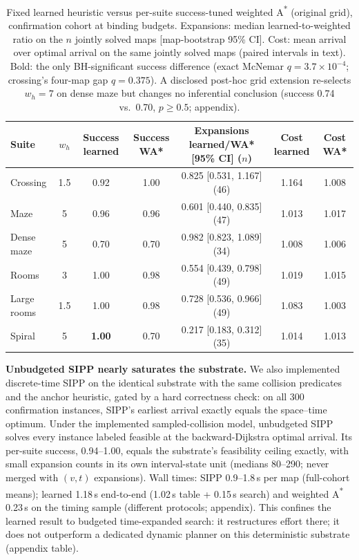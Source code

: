 \documentclass[letterpaper]{article} %
\begin{document}
\begin{table}[t]
\centering
\small
\begin{tabular}{lcccccc}
\toprule
Suite & $w_h$ & Success learned & Success WA* & Expansions learned/WA* [95\% CI] ($n$) & Cost learned & Cost WA* \\
\midrule
Crossing & 1.5 & 0.92 & 1.00 & 0.825 [0.531, 1.167] (46) & 1.164 & 1.008 \\
Maze & 5 & 0.96 & 0.96 & 0.601 [0.440, 0.835] (47) & 1.013 & 1.017 \\
Dense maze & 5 & 0.70 & 0.70 & 0.982 [0.823, 1.089] (34) & 1.008 & 1.006 \\
Rooms & 3 & 1.00 & 0.98 & 0.554 [0.439, 0.798] (49) & 1.019 & 1.015 \\
Large rooms & 1.5 & 1.00 & 0.98 & 0.728 [0.536, 0.966] (49) & 1.083 & 1.003 \\
Spiral & 5 & \textbf{1.00} & 0.70 & 0.217 [0.183, 0.312] (35) & 1.014 & 1.013 \\
\bottomrule
\end{tabular}
\caption{Fixed learned heuristic versus per-suite success-tuned weighted A\textsuperscript{*} (original grid), confirmation cohort at binding budgets. Expansions: median learned-to-weighted ratio on the $n$ jointly solved maps [map-bootstrap 95\% CI]. Cost: mean arrival over optimal arrival on the same jointly solved maps (paired intervals in text). Bold: the only BH-significant success difference (exact McNemar $q{=}3.7\times10^{-4}$; crossing's four-map gap $q{=}0.375$). A disclosed post-hoc grid extension re-selects $w_h{=}7$ on dense maze but changes no inferential conclusion (success 0.74 vs.\ 0.70, $p \geq 0.5$; appendix).}
\label{tab:wastar-main}
\end{table}

\textbf{Unbudgeted SIPP nearly saturates the substrate.} We also implemented discrete-time SIPP \citep{phillips2011sipp} on the identical substrate with the same collision predicates and the anchor heuristic, gated by a hard correctness check: on all 300 confirmation instances, SIPP's earliest arrival exactly equals the space--time optimum. Under the implemented sampled-collision model, unbudgeted SIPP solves every instance labeled feasible at the backward-Dijkstra optimal arrival. Its per-suite success, 0.94--1.00, equals the substrate's feasibility ceiling exactly, with small expansion counts in its own interval-state unit (medians 80--290; never merged with $(v,t)$ expansions). Wall times: SIPP 0.9--1.8\,s per map (full-cohort means); learned 1.18\,s end-to-end (1.02\,s table + 0.15\,s search) and weighted A\textsuperscript{*} 0.23\,s on the timing sample (different protocols; appendix). This confines the learned result to budgeted time-expanded search: it restructures effort there; it does not outperform a dedicated dynamic planner on this deterministic substrate (appendix table).
\end{document}
